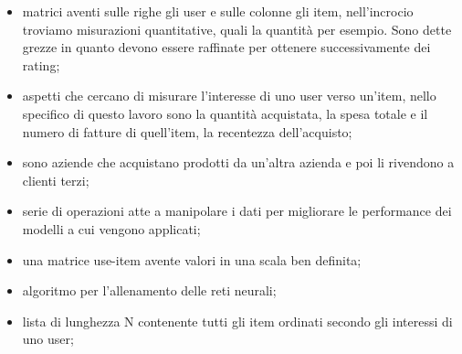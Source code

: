 
\begin{itemize} 
	\item {} matrici aventi sulle righe gli user e sulle colonne gli item, nell'incrocio troviamo misurazioni quantitative, quali la quantità per esempio. Sono dette grezze in quanto devono essere raffinate per ottenere successivamente dei rating;
	\item {} aspetti che cercano di misurare l'interesse di uno user verso un'item, nello specifico di questo lavoro sono la quantità acquistata, la spesa totale e il numero di fatture di quell'item, la recentezza dell'acquisto;
	\item {} sono aziende che acquistano prodotti da un'altra azienda e poi li rivendono a clienti terzi;
	\item {} serie di operazioni atte a manipolare i dati per migliorare le performance dei modelli a cui vengono applicati;
	\item {} una matrice use-item avente valori in una scala ben definita;
	\item {} algoritmo per l'allenamento delle reti neurali;
	\item {} lista di lunghezza N contenente tutti gli item ordinati secondo gli interessi di uno user;
\end{itemize}